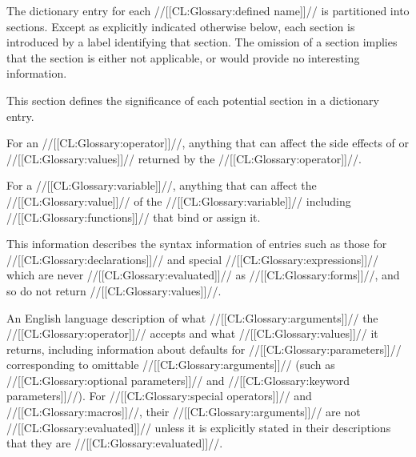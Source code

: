 
The dictionary entry for each //[[CL:Glossary:defined name]]// is partitioned into
sections.  Except as explicitly indicated otherwise below, each section
is introduced by a label identifying that section.  The omission of a
section implies that the section is either not applicable, or would
provide no interesting information.

This section defines the significance of each potential section in a
dictionary entry.


For an //[[CL:Glossary:operator]]//, anything that can affect the side effects of
or //[[CL:Glossary:values]]// returned by the //[[CL:Glossary:operator]]//.

For a //[[CL:Glossary:variable]]//, anything that can affect the //[[CL:Glossary:value]]// of the //[[CL:Glossary:variable]]//
including //[[CL:Glossary:functions]]// that bind or assign it.

\endsubsubsection%


This information describes the syntax information of entries such as those for
//[[CL:Glossary:declarations]]// and special //[[CL:Glossary:expressions]]// which are never //[[CL:Glossary:evaluated]]//
as //[[CL:Glossary:forms]]//, and so do not return //[[CL:Glossary:values]]//.

\endsubsubsection%


An English language description of what //[[CL:Glossary:arguments]]// the //[[CL:Glossary:operator]]// accepts
and what //[[CL:Glossary:values]]// it returns, including information about defaults for //[[CL:Glossary:parameters]]//
corresponding to omittable //[[CL:Glossary:arguments]]//
(such as //[[CL:Glossary:optional parameters]]// and //[[CL:Glossary:keyword parameters]]//).
For //[[CL:Glossary:special operators]]// and //[[CL:Glossary:macros]]//,
their //[[CL:Glossary:arguments]]// are not //[[CL:Glossary:evaluated]]// unless it is explicitly stated in their
descriptions that they are //[[CL:Glossary:evaluated]]//.




